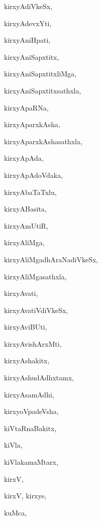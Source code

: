 \begin{multicols}{2}
{kirxyAdiVkeSx}, \pageref{kirxyAdiVkeSx}

{kirxyAdevxYti}, \pageref{kirxyAdevxYti}

{kirxyAniHpati}, \pageref{kirxyAniHpati}

{kirxyAniSapxtitx}, \pageref{kirxyAniSapxtitx}

{kirxyAniSapxtitxliMga}, \pageref{kirxyAniSapxtitxliMga}

{kirxyAniSapxtitxsathxla}, \pageref{kirxyAniSapxtitxsathxla}

{kirxyApaRNa}, \pageref{kirxyApaRNa}

{kirxyAparxkAsha}, \pageref{kirxyAparxkAsha}

{kirxyAparxkAshasathxla}, \pageref{kirxyAparxkAshasathxla}

{kirxyApAda}, \pageref{kirxyApAda}

{kirxyApAdoVdaka}, \pageref{kirxyApAdoVdaka}

{kirxyAbaTaTxlu}, \pageref{kirxyAbaTaTxlu}

{kirxyABasita}, \pageref{kirxyABasita}

{kirxyAmUtiR}, \pageref{kirxyAmUtiR}

{kirxyAliMga}, \pageref{kirxyAliMga}

{kirxyAliMgadhAraNadiVkeSx}, \pageref{kirxyAliMgadhAraNadiVkeSx}

{kirxyAliMgasathxla}, \pageref{kirxyAliMgasathxla}

{kirxyAvati}, \pageref{kirxyAvati}

{kirxyAvatiVdiVkeSx}, \pageref{kirxyAvatiVdiVkeSx}

{kirxyAviBUti}, \pageref{kirxyAviBUti}

{kirxyAvishArxMti}, \pageref{kirxyAvishArxMti}

{kirxyAshakitx}, \pageref{kirxyAshakitx}

{kirxyAshudAdhxtamx}, \pageref{kirxyAshudAdhxtamx}

{kirxyAsamAdhi}, \pageref{kirxyAsamAdhi}

{kirxyoVpadeVsha}, \pageref{kirxyoVpadeVsha}

{kiVtaRnaBakitx}, \pageref{kiVtaRnaBakitx}

{kiVla}, \pageref{kiVla}

{kiVlakamaMtarx}, \pageref{kiVlakamaMtarx}

{kirxV}, \pageref{kirxV}

{kirxV, kirxye}, \pageref{kirxV, kirxye}

{kuMca}, \pageref{kuMca}


\end{multicols}
